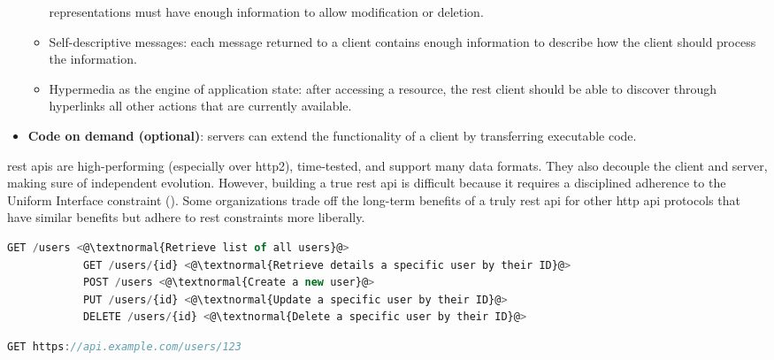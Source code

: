 \begin{multicols}{2}
\begin{itemize}
\begin{itemize}
                              representations must have enough information to allow modification or deletion.
                        \item Self-descriptive messages: each message returned to a client contains enough information to describe 
                              how the client should process the information.
                        \item Hypermedia as the engine of application state: after accessing a resource, the \acrshort{rest} client
                              should be able to discover through hyperlinks all other actions that are currently available.
                  \end{itemize}
            \item \textbf{Code on demand (optional)}: servers can extend the functionality of a client by transferring
                  executable code.
      \end{itemize}
      \acrshort{rest} \acrshort{api}s are high-performing (especially over \acrshort{http}2), time-tested, and support 
      many data formats. They also decouple the client and server, making sure of independent evolution. However,
      building a true \acrshort{rest} \acrshort{api} is difficult because it requires a disciplined adherence to the 
      Uniform Interface constraint (\cite{restapiuniforminterface}). Some organizations trade off the long-term benefits
      of a truly \acrshort{rest} \acrshort{api} for other \acrshort{http} \acrshort{api} protocols that have similar 
      benefits but adhere to \acrshort{rest} constraints more liberally.
      \end{multicols}
      \begin{lstlisting}[language=JavaScript, caption=Different HTTP methods in REST]
            GET /users <@\textnormal{Retrieve list of all users}@>
            GET /users/{id} <@\textnormal{Retrieve details a specific user by their ID}@>
            POST /users <@\textnormal{Create a new user}@>
            PUT /users/{id} <@\textnormal{Update a specific user by their ID}@>
            DELETE /users/{id} <@\textnormal{Delete a specific user by their ID}@>
      \end{lstlisting}
      \begin{lstlisting}[language=JavaScript, caption=REST's Example]
            GET https://api.example.com/users/123
      \end{lstlisting}
